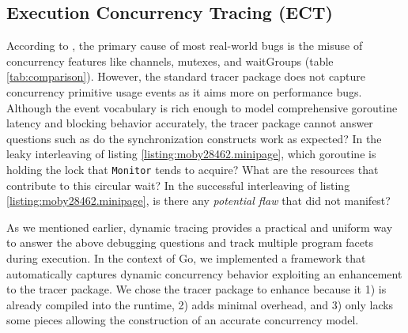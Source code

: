 \subsection{Execution Concurrency Tracing (ECT)}
\label{sec:ect}
According to \cite{tu-concurrentBugs-asplos19,yuan-gobench-cgo21}, the primary cause of most real-world bugs is the misuse of concurrency features like channels, mutexes, and waitGroups (table \ref{tab:comparison}).
%
However, the standard tracer package does not capture concurrency primitive usage events as it aims more on performance bugs.
%
Although the event vocabulary is rich enough to model comprehensive goroutine latency and blocking behavior accurately, the tracer package cannot answer questions such as do the synchronization constructs work as expected? In the leaky
interleaving
of listing \ref{listing:moby28462.minipage}, which goroutine is holding the lock that \texttt{Monitor} tends to acquire? What are the resources that contribute to this circular wait? In the successful interleaving of listing \ref{listing:moby28462.minipage}, is there any \textit{potential flaw} that did not manifest?

%
As we mentioned earlier, dynamic tracing provides a practical and uniform way to answer the above debugging questions and track multiple program facets during
execution.
%
In the context of Go, we implemented a framework that automatically captures dynamic concurrency behavior exploiting an enhancement to the tracer package.
%
We chose the tracer package to enhance because it 1) is already compiled into the runtime, 2) adds minimal overhead, and 3) only lacks some pieces allowing the construction of an accurate concurrency model.
%

